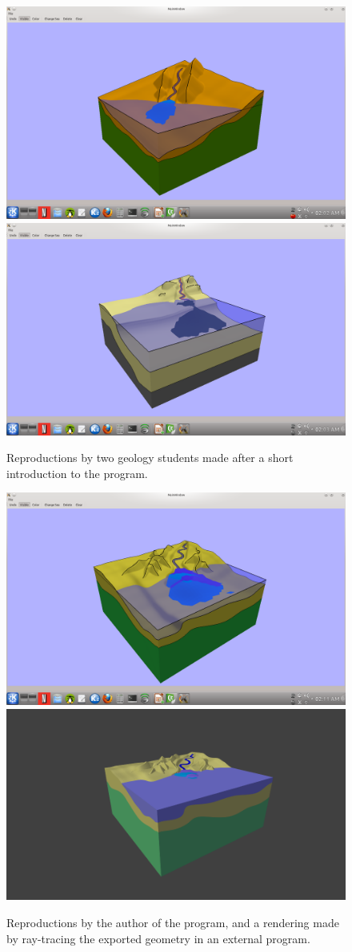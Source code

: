 \documentclass[a4paper,12pt]{report}
\begin{document}
\begin{figure}
\includegraphics[trim = 90mm 22mm 80mm 30mm, clip,width=.5\linewidth]{thesis/resultsSection/sketch/user.png}
\includegraphics[trim = 90mm 22mm 80mm 30mm, clip,width=.5\linewidth]{thesis/resultsSection/sketch/user2.png}
 \caption{Reproductions by two geology students made after a short introduction to the program.}
 \label{fig:sketchRepro}
\end{figure}

\begin{figure}
\includegraphics[trim = 90mm 22mm 80mm 30mm, clip,width=.5\linewidth]{thesis/resultsSection/sketch/author.png}
\includegraphics[trim = 40mm 0mm 30mm 9mm, clip,width=.5\linewidth]{thesis/resultsSection/sketch/authorBlend.png}
 \caption{Reproductions by the author of the program, and a rendering made by ray-tracing the exported geometry in an external program.}
 \label{fig:sketchRepro2}
\end{figure}
\end{document}
